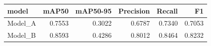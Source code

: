 \begin{tabular}{lrrrrr}
\toprule
model & mAP50 & mAP50-95 & Precision & Recall & F1 \\
\midrule
Model_A & 0.7553 & 0.3022 & 0.6787 & 0.7340 & 0.7053 \\
Model_B & 0.8593 & 0.4286 & 0.8012 & 0.8464 & 0.8232 \\
\bottomrule
\end{tabular}
